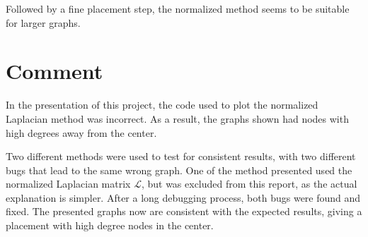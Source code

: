 \documentclass[a4paper,twocolumn]{article}
\begin{document}
Followed by a fine placement step, the normalized method seems to be suitable 
for larger graphs.




\newpage

\appendix

\section{Comment}

In the presentation of this project, the code used to plot the normalized 
Laplacian method was incorrect. As a result, the graphs shown had nodes with 
high degrees away from the center.

Two different methods were used to test for consistent results, with two 
different bugs that lead to the same wrong graph.  One of the method presented 
used the normalized Laplacian matrix $\mathcal L$, but was excluded from this 
report, as the actual explanation is simpler. After a long debugging process, 
both bugs were found and fixed. The presented graphs now are consistent with the 
expected results, giving a placement with high degree nodes in the center.
\end{document}

